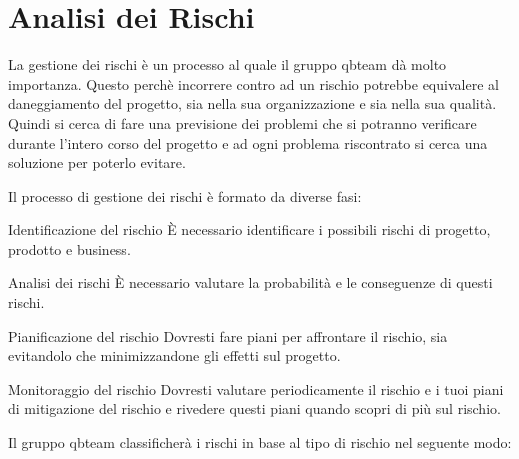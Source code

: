 \section{Analisi dei Rischi}
La gestione dei rischi è un processo al quale il gruppo qbteam dà molto importanza. Questo perchè incorrere contro ad un rischio potrebbe equivalere al daneggiamento del progetto, sia nella sua organizzazione e sia nella sua qualità.
Quindi si cerca di fare una previsione dei problemi che si potranno verificare durante l'intero corso del progetto e ad ogni problema riscontrato si cerca una soluzione per poterlo evitare.

Il processo di gestione dei rischi è formato da diverse fasi:
\item Identificazione del rischio È necessario identificare i possibili rischi di progetto, prodotto e business.  
\item Analisi dei rischi È necessario valutare la probabilità e le conseguenze di questi rischi.  
\item Pianificazione del rischio Dovresti fare piani per affrontare il rischio, sia evitandolo che minimizzandone gli effetti sul progetto. 
\item Monitoraggio del rischio Dovresti valutare periodicamente il rischio e i tuoi piani di mitigazione del rischio e rivedere questi piani quando scopri di più sul rischio.

Il gruppo qbteam classificherà i rischi in base al tipo di rischio nel seguente modo:
